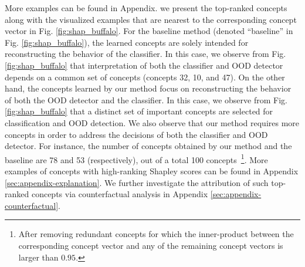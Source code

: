 More examples can be found in Appendix.
we present the top-ranked concepts along with the visualized examples that are nearest to the corresponding concept vector in Fig. \ref{fig:shap_buffalo}.
For the baseline method \citep{yeh2020completeness} (denoted ``baseline'' in Fig. \ref{fig:shap_buffalo}), the learned concepts are solely intended for reconstructing the behavior of the classifier. 
In this case, we observe from Fig. \ref{fig:shap_buffalo} that 
interpretation of both the classifier and OOD detector depends on a common set of concepts (\ie concepts 32, 10, and 47).
On the other hand, the concepts learned by our method focus on reconstructing the behavior of both the OOD detector and the classifier. In this case, we observe from Fig. \ref{fig:shap_buffalo} that a distinct set of important concepts are selected for classification and OOD detection.
We also observe that our method requires more concepts in order to address the decisions of both the classifier and OOD detector.
For instance, the number of concepts obtained by our method and the baseline are 78 and 53 (respectively), out of a total 100 concepts~\footnote{After removing redundant concepts for which the inner-product between the corresponding concept vector and any of the remaining concept vectors is larger than $0.95$.}.
More examples of concepts with high-ranking Shapley scores can be found in Appendix \ref{sec:appendix-explanation}.
We further investigate the attribution of such top-ranked concepts via counterfactual analysis in Appendix \ref{sec:appendix-counterfactual}.

\fi

